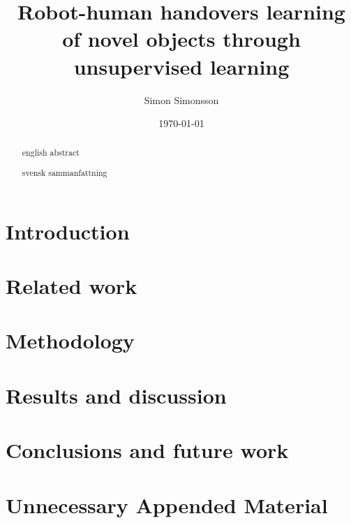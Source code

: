 \documentclass{kththesis}
\title{Robot-human handovers learning of novel objects through unsupervised learning}
\author{Simon Simonsson}
\date{\today}
\begin{document}
\frontmatter %
\titlepage

\begin{abstract}
	english abstract
\end{abstract}

\begin{otherlanguage}{swedish}
	\begin{abstract}
		svensk sammanfattning
	\end{abstract}
\end{otherlanguage}

\tableofcontents

\mainmatter %

\chapter{Introduction}


\chapter{Related work}


\chapter{Methodology}


\chapter{Results and discussion}


\chapter{Conclusions and future work}


\printbibliography[heading=bibintoc] %

\appendix
\chapter{Unnecessary Appended Material}
\end{document}
